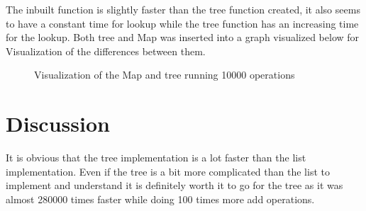 \documentclass[a4paper,11pt]{article}
\begin{document}
\FloatBarrier{\noindent}
The inbuilt function is slightly faster than the tree function created, it also seems to have a constant time for lookup while the tree function has an increasing time for the lookup. 
Both tree and Map was inserted into a graph visualized below for Visualization of the differences between them.
\begin{figure}[h]
    \centering    
    
    \scalebox{0.8}{}
    \caption{Visualization of the Map and tree running 10000 operations}   
    \label{tab:figure2} 
    
    \end{figure}
\FloatBarrier{\noindent}
\section*{Discussion}
It is obvious that the tree implementation is a lot faster than the list implementation. Even if the tree is a bit more complicated than the list to implement and understand it is definitely worth it to go for the tree as it was 
almost 280000 times faster while doing 100 times more add operations.
\end{document}
